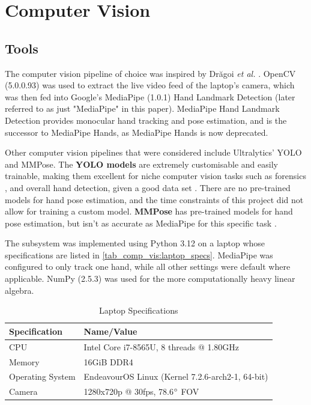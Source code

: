 \chapter{Computer Vision}\label{ch:comp_vis}

\section{Tools}
The computer vision pipeline of choice was inspired by Drăgoi \textit{et al.} \cite{bib:teleoperation_intuitive_using_MediaPipeHands}. OpenCV (5.0.0.93) was used to extract the live video feed of the laptop's camera, which was then fed into Google's MediaPipe (1.0.1) Hand Landmark Detection (later referred to as just "MediaPipe" in this paper). MediaPipe Hand Landmark Detection provides monocular hand tracking and pose estimation, and is the successor to MediaPipe Hands, as MediaPipe Hands is now deprecated.

Other computer vision pipelines that were considered include Ultralytics' YOLO and MMPose. The \textbf{YOLO models} are extremely customisable and easily trainable, making them excellent for niche computer vision tasks such as forensics \cite{bib:YOLO_in_forensics}, and overall hand detection, given a good data set \cite{bib:YOLO_in_complex_background}. There are no pre-trained models for hand pose estimation, and the time constraints of this project did not allow for training a custom model. \textbf{MMPose} has pre-trained models for hand pose estimation, but isn't as accurate as MediaPipe for this specific task \cite{bib:MMPose_versus_MediaPipe}.

The subsystem was implemented using Python 3.12 on a laptop whose specifications are listed in \autoref{tab_comp_vis:laptop_specs}. MediaPipe was configured to only track one hand, while all other settings were default where applicable. NumPy (2.5.3) was used for the more computationally heavy linear algebra.

\begin{table}[h!]
\centering
\caption{Laptop Specifications}
\label{tab_comp_vis:laptop_specs}
\begin{tabular}{|l|l|}
    \hline
    \textbf{Specification} & \textbf{Name/Value} \\
    \hline \hline
    CPU & Intel Core i7-8565U, 8 threads @ 1.80GHz \\
    \hline
    Memory & 16GiB DDR4 \\
    \hline
    Operating System & EndeavourOS Linux (Kernel 7.2.6-arch2-1, 64-bit) \\
    \hline
    Camera & 1280x720p @ 30fps, 78.6$\degree$ FOV \\ 
    \hline
\end{tabular}
\end{table}

